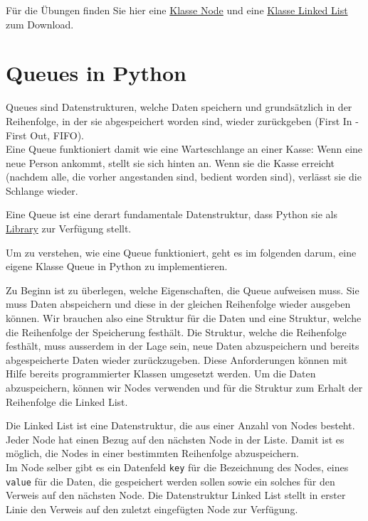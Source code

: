 \documentclass[
  nswissgerman,
  a4paper,
  DIV=11,
  numbers=noendperiod,
  ngerman]{scrreprt}
\begin{document}
Für die Übungen finden Sie hier eine \href{src/nodes.py}{Klasse Node}
und eine \href{src/linked_list.py}{Klasse Linked List} zum Download.

\chapter{Queues in Python}\label{queues-in-python}

Queues sind Datenstrukturen, welche Daten speichern und grundsätzlich in
der Reihenfolge, in der sie abgespeichert worden sind, wieder
zurückgeben (First In - First Out, FIFO).\\
Eine Queue funktioniert damit wie eine Warteschlange an einer Kasse:
Wenn eine neue Person ankommt, stellt sie sich hinten an. Wenn sie die
Kasse erreicht (nachdem alle, die vorher angestanden sind, bedient
worden sind), verlässt sie die Schlange wieder.

Eine Queue ist eine derart fundamentale Datenstruktur, dass Python sie
als \href{https://docs.python.org/3/library/queue.html}{Library} zur
Verfügung stellt.

Um zu verstehen, wie eine Queue funktioniert, geht es im folgenden
darum, eine eigene Klasse Queue in Python zu implementieren.

Zu Beginn ist zu überlegen, welche Eigenschaften, die Queue aufweisen
muss. Sie muss Daten abspeichern und diese in der gleichen Reihenfolge
wieder ausgeben können. Wir brauchen also eine Struktur für die Daten
und eine Struktur, welche die Reihenfolge der Speicherung festhält. Die
Struktur, welche die Reihenfolge festhält, muss ausserdem in der Lage
sein, neue Daten abzuspeichern und bereits abgespeicherte Daten wieder
zurückzugeben. Diese Anforderungen können mit Hilfe bereits
programmierter Klassen umgesetzt werden. Um die Daten abzuspeichern,
können wir Nodes verwenden und für die Struktur zum Erhalt der
Reihenfolge die Linked List.

\begin{tcolorbox}[enhanced jigsaw, arc=.35mm, bottomrule=.15mm, bottomtitle=1mm, breakable, colback=white, colbacktitle=quarto-callout-note-color!10!white, colframe=quarto-callout-note-color-frame, coltitle=black, left=2mm, leftrule=.75mm, opacityback=0, opacitybacktitle=0.6, rightrule=.15mm, title=\textcolor{quarto-callout-note-color}{\faInfo}\hspace{0.5em}{Linked List}, titlerule=0mm, toprule=.15mm, toptitle=1mm]

Die Linked List ist eine Datenstruktur, die aus einer Anzahl von Nodes
besteht. Jeder Node hat einen Bezug auf den nächsten Node in der Liste.
Damit ist es möglich, die Nodes in einer bestimmten Reihenfolge
abzuspeichern.\\
Im Node selber gibt es ein Datenfeld \texttt{key} für die Bezeichnung
des Nodes, eines \texttt{value} für die Daten, die gespeichert werden
sollen sowie ein solches für den Verweis auf den nächsten Node. Die
Datenstruktur Linked List stellt in erster Linie den Verweis auf den
zuletzt eingefügten Node zur Verfügung.

\end{tcolorbox}
\end{document}
